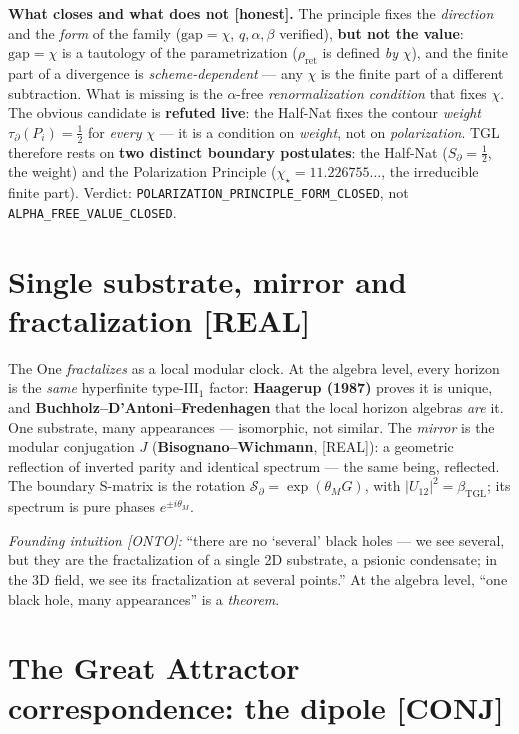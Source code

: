 \documentclass[11pt]{article}
\newcommand{\bTGL}{\beta_{\mathrm{TGL}}}\newcommand{\Msun}{M_{\odot}}\newcommand{\TGL}{\mathrm{TGL}}
\theoremstyle{definition}\newtheorem{deriv}{Derivation}
\begin{document}
\textbf{What closes and what does not \textsf{[honest]}.} The principle fixes the \emph{direction} and the \emph{form} of the family ($\mathrm{gap}=\chi$, $q,\alpha,\beta$ verified), \textbf{but not the value}: $\mathrm{gap}=\chi$ is a tautology of the parametrization ($\rho_{\mathrm{ret}}$ is defined \emph{by} $\chi$), and the finite part of a divergence is \emph{scheme-dependent} --- any $\chi$ is the finite part of a different subtraction. What is missing is the $\alpha$-free \emph{renormalization condition} that fixes $\chi$. The obvious candidate is \textbf{refuted live}: the Half-Nat fixes the contour \emph{weight} $\tau_\partial(P_i)=\tfrac12$ for \emph{every} $\chi$ --- it is a condition on \emph{weight}, not on \emph{polarization}. TGL therefore rests on \textbf{two distinct boundary postulates}: the Half-Nat ($S_\partial=\tfrac12$, the weight) and the Polarization Principle ($\chi_\star=11.226755\ldots$, the irreducible finite part). Verdict: \texttt{POLARIZATION\_PRINCIPLE\_FORM\_CLOSED}, not \texttt{ALPHA\_FREE\_VALUE\_CLOSED}.

\section{Single substrate, mirror and fractalization \textsf{[REAL]}}

The One \emph{fractalizes} as a local modular clock. At the algebra level, every horizon is the \emph{same} hyperfinite type-$\mathrm{III}_1$ factor: \textbf{Haagerup (1987)} proves it is unique, and \textbf{Buchholz--D'Antoni--Fredenhagen} that the local horizon algebras \emph{are} it. One substrate, many appearances --- isomorphic, not similar. The \emph{mirror} is the modular conjugation $J$ (\textbf{Bisognano--Wichmann}, \textsf{[REAL]}): a geometric reflection of inverted parity and identical spectrum --- the same being, reflected. The boundary S-matrix is the rotation $\mathcal{S}_\partial=\exp(\theta_M G)$, with $|U_{12}|^2=\bTGL$; its spectrum is pure phases $e^{\pm i\theta_M}$.

\emph{Founding intuition \textsf{[ONTO]}:} ``there are no `several' black holes --- we see several, but they are the fractalization of a single 2D substrate, a psionic condensate; in the 3D field, we see its fractalization at several points.'' At the algebra level, ``one black hole, many appearances'' is a \emph{theorem}.

\section{The Great Attractor correspondence: the dipole \textsf{[CONJ]}}
\end{document}
